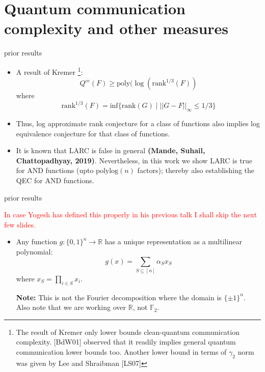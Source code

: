 	\section{Quantum communication complexity and other measures}
\begin{frame}{prior results}
	\begin{itemize}
		\item<1-> A result of Kremer \footnote{The result of Kremer only lower bounds clean-quantum communication complexity. [BdW01] observed that it readily implies general quantum communication lower bounds too. Another lower bound in terms of $\gamma_2$ norm was given by Lee and Shraibman [LS07]}: 
		$$Q^{cc}(F) \geq \text{poly}(\log(\text{rank}^{1/3}(F))$$
		where 
		$$ \text{rank}^{1/3}(F)= \text{inf} \{\text{rank}(G) \mid ||G-F||_{\infty} \leq 1/3\} $$
		\item<2-> Thus, log approximate rank conjecture for a class of functions also implies log equivalence conjecture for that class of functions.
		\item<3-> It is known that LARC is false in general \textbf{(Mande, Suhail, Chattopadhyay, 2019)}. Nevertheless, in this work we show LARC is true for AND functions (upto $\text{polylog}(n)$ factors); thereby also establishing the QEC for AND functions.	
	\end{itemize}
	
	
\end{frame}


\begin{frame}{prior results}
	
	
	
	\textcolor{red}{In case Yogesh has defined this properly in his previous talk I shall skip the next few slides.}
	
	\begin{itemize}
		\item<1-> Any function $g: \{0,1\}^n \rightarrow \mathbb{R}$ has a unique representation as a multilinear polynomial:
		$$ g(x) = \displaystyle \sum_{S \subseteq [n]} \alpha_S x_S$$
		where $x_S= \displaystyle \prod_{i \in S} x_i$. \newline
		
		\textbf{Note: }This is not the Fourier decomposition where the domain is $\{ \pm 1\}^n$. Also note that we are working over $\mathbb{R}$, not $\mathbb{F}_2$. 
	\end{itemize}
	
\end{frame}


